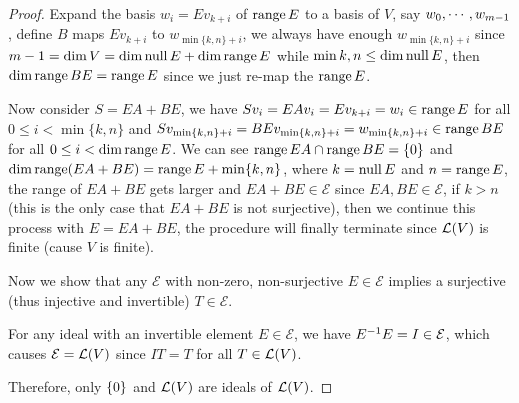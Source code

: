 \documentclass[../main.tex]{subfiles}
\begin{document}
\begin{proof}
  Expand the basis $w_i = Ev_{k + i}$ of $\operatorname{range} E$ to a basis of $V$, say $w_0 , \cdots , w_{m - 1}$, define $B$
  maps $Ev_{k + i}$ to $w_{\min\{k, n\} + i}$, we always have enough $w_{\min\{k, n\} + i}$ since
  $m - 1 = \dim V = \dim \operatorname{null} E + \dim \operatorname{range} E$ while $\min{k, n} \le \dim \operatorname{null} E$,
  then $\dim \operatorname{range} BE = \operatorname{range} E$ since we just re-map the $\operatorname{range} E$.
  
  Now consider $S = EA + BE$, we have $Sv_i = EAv_i = Ev_{k + i} = w_i \in \operatorname{range} E$ for all $0 \le i < \min\{k, n\}$
  and $Sv_{\min\{k, n\} + i} = BEv_{\min\{k, n\} + i} = w_{\min\{k, n\} + i} \in \operatorname{range} BE$ for all $0 \le i < \dim \operatorname{range} E$.
  We can see $\operatorname{range} EA \cap \operatorname{range} BE = \{0\}$ and $\dim \operatorname{range} (EA + BE) = \operatorname{range} E + \min\{k, n\}$,
  where $k = \operatorname{null} E$ and $n = \operatorname{range} E$, the range of $EA + BE$ gets larger and $EA + BE \in \mathcal{E}$
  since $EA, BE \in \mathcal{E}$, if $k > n$ (this is the only case that $EA + BE$ is not surjective),
  then we continue this process with $E = EA + BE$, the procedure will finally terminate
  since $\mathcal{L}(V)$ is finite (cause $V$ is finite).

  Now we show that any $\mathcal{E}$ with non-zero, non-surjective $E \in \mathcal{E}$ implies a surjective (thus injective and invertible) $T \in \mathcal{E}$.

  For any ideal with an invertible element $E \in \mathcal{E}$, we have $E^{-1}E = I \in \mathcal{E}$,
  which causes $\mathcal{E} = \mathcal{L}(V)$ since $IT = T$ for all $T \in \mathcal{L}(V)$.

  Therefore, only $\{0\}$ and $\mathcal{L}(V)$ are ideals of $\mathcal{L}(V)$.
\end{proof}
\end{document}
